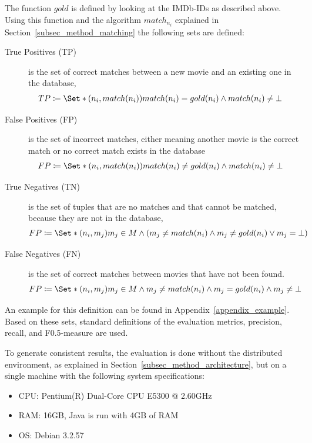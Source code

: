 The function $gold$ is defined by looking at the IMDb-IDs as described above.
Using this function and the algorithm $match_{n_{i}}$ explained in Section~\ref{subsec_method_matching} the following sets are defined:

\begin{description}
\item[True Positives (TP)] is the set of correct matches between a new movie and an existing one in the database,
\begin{align}
TP &\coloneqq \Set*{(n_i, match(n_i))}{match(n_i) = gold(n_i) \land match(n_i) \neq \bot}
\end{align}
\item[False Positives (FP)] is the set of incorrect matches, either meaning another movie is the correct match or no correct match exists in the database
\begin{align}
FP &\coloneqq \Set*{(n_i, match(n_i))}{match(n_i) \neq gold(n_i) \land match(n_i) \neq \bot}
\end{align}
\item[True Negatives (TN)] is the set of tuples that are no matches and that cannot be matched, because they are not in the database,
\begin{align}
FP &\coloneqq \Set*{(n_i, m_j)}{m_j \in M \land (m_j \neq match(n_i) \land m_j \neq gold(n_i) \lor m_j = \bot)}
\end{align}
\item[False Negatives (FN)] is the set of correct matches between movies that have not been found.
\begin{align}
FP &\coloneqq \Set*{(n_i, m_j)}{m_j \in M \land m_j \neq match(n_i) \land m_j = gold(n_i) \land m_j \neq \bot}
\end{align}
\end{description}

An example for this definition can be found in Appendix~\ref{appendix_example}.
Based on these sets, standard definitions of the evaluation metrics, precision, recall, and F0.5-measure are used.

To generate consistent results, the evaluation is done without the distributed environment, as explained in Section~\ref{subsec_method_architecture}, but on a single machine with the following system specifications:
\newpage
\begin{itemize}
	\item CPU: Pentium(R) Dual-Core  CPU E5300  @ 2.60GHz
	\item RAM: 16GB, Java is run with 4GB of RAM
	\item OS: Debian 3.2.57
\end{itemize}

